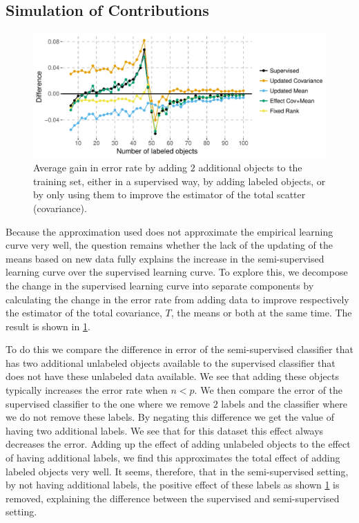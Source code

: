 \documentclass[runningheads,a4paper]{llncs}\usepackage[]{graphicx}\usepackage[]{color}
\makeatletter
\def\maxwidth{ %
  \ifdim\Gin@nat@width>\linewidth
    \linewidth
  \else
    \Gin@nat@width
  \fi
}
\newenvironment{knitrout}{}{} %
\makeatother
\begin{document}
\subsection{Simulation of Contributions}
\begin{knitrout}
\color{fgcolor}\begin{figure}
\includegraphics[width=\maxwidth]{figure/contributions-1} \caption[Average gain in error rate by adding $2$ additional objects to the training set, either in a supervised way, by adding labeled objects, or by only using them to improve the estimator of the total scatter (covariance)]{Average gain in error rate by adding $2$ additional objects to the training set, either in a supervised way, by adding labeled objects, or by only using them to improve the estimator of the total scatter (covariance).}\label{fig:contributions}
\end{figure}


\end{knitrout}
Because the approximation used does not approximate the empirical learning curve very well, the question remains whether the lack of the updating of the means based on new data fully explains the increase in the semi-supervised learning curve over the supervised learning curve. To explore this, we decompose the change in the supervised learning curve into separate components by calculating the change in the error rate from adding data to improve respectively the estimator of the total covariance, $T$, the means or both at the same time. The result is shown in \cref{fig:contributions}.

To do this we compare the difference in error of the semi-supervised classifier that has two additional unlabeled objects available to the supervised classifier that does not have these unlabeled data available. We see that adding these objects typically increases the error rate when $n<p$.  We then compare the error of the supervised classifier to the one where we remove $2$ labels and the classifier where we do not remove these labels. By negating this difference we get the value of having two additional labels. We see that for this dataset this effect always decreases the error.  Adding up the effect of adding unlabeled objects to the effect of having additional labels, we find this approximates the total effect of adding labeled objects very well. It seems, therefore, that in the semi-supervised setting, by not having additional labels, the positive effect of these labels as shown \cref{fig:contributions} is removed, explaining the difference between the supervised and semi-supervised setting.
\end{document}
